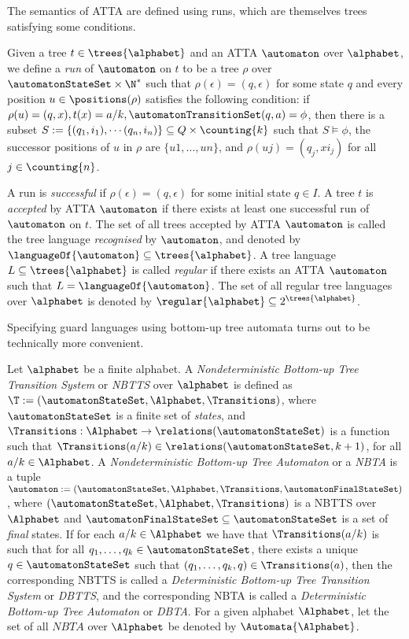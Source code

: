 The semantics of ATTA are defined using runs, which are themselves trees satisfying some conditions.
\begin{definition}\label{def:acceptanceByAtta}
    Given a tree $t \in \trees{\alphabet}$ and an ATTA $\automaton$ over $\alphabet$, we define a \emph{run} of $\automaton$ on $t$ to be a tree $\rho$ over $\automatonStateSet \times \N^*$ such that $\rho(\epsilon) = (q, \epsilon)$ for some state $q$ and every position $u \in \positions(\rho)$ satisfies the following condition: if $\rho(u) = (q, x), t(x) = a/k, \automatonTransitionSet(q ,a) = \phi$, then there is a subset $S := \{(q_1, i_1), \dotsm (q_n, i_n)\} \subseteq Q \times \counting{k}$ such that $S \models \phi$, the successor positions of $u$ in $\rho$ are $\{u1, \dots, un\}$, and $\rho(uj) = (q_j, xi_j)$ for all $j \in \counting{n}$.
    
    A run is \emph{successful} if $\rho(\epsilon) = (q, \epsilon)$ for some initial state $q \in I$. A tree $t$ is \emph{accepted} by ATTA $\automaton$ if there exists at least one successful run of $\automaton$ on $t$. The set of all trees accepted by ATTA $\automaton$ is called the tree language \emph{recognised} by $\automaton$, and denoted by $\languageOf{\automaton} \subseteq \trees{\alphabet}$. A tree language $L \subseteq \trees{\alphabet}$ is called \emph{regular} if there exists an ATTA $\automaton$ such that $L = \languageOf{\automaton}$. The set of all regular tree languages over $\alphabet$ is denoted by $\regular{\alphabet} \subseteq 2^{\trees{\alphabet}}$.
\end{definition}

Specifying guard languages using bottom-up tree automata turns out to be technically more convenient.
\begin{definition}\label{def:nbtts}
    Let $\alphabet$ be a finite alphabet. A \emph{Nondeterministic Bottom-up Tree Transition System} or \emph{NBTTS} over $\alphabet$ is defined as $\T := (\automatonStateSet, \Alphabet, \Transitions)$, where $\automatonStateSet$ is a finite set of \emph{states}, and $\Transitions : \Alphabet \to \relations(\automatonStateSet)$ is a function such that $\Transitions(a/k) \in \relations(\automatonStateSet, k+1)$, for all $a/k \in \Alphabet$. A \emph{Nondeterministic Bottom-up Tree Automaton} or a \emph{NBTA} is a tuple $\automaton := (\automatonStateSet, \Alphabet, \Transitions, \automatonFinalStateSet)$, where $(\automatonStateSet, \Alphabet, \Transitions)$ is a NBTTS over $\Alphabet$ and $\automatonFinalStateSet \subseteq \automatonStateSet$ is a set of \emph{final} states. If for each $a/k \in \Alphabet$ we have that $\Transitions(a/k)$ is such that for all $q_1, \dots, q_k \in \automatonStateSet$, there exists a unique $q \in \automatonStateSet$ such that $(q_1, \dots, q_k, q) \in \Transitions(a)$, then the corresponding NBTTS is called a \emph{Deterministic Bottom-up Tree Transition System} or \emph{DBTTS}, and the corresponding NBTA is called a \emph{Deterministic Bottom-up Tree Automaton} or \emph{DBTA}. For a given alphabet $\Alphabet$, let the set of all $NBTA$ over $\Alphabet$ be denoted by  $\Automata{\Alphabet}$.
\end{definition}

